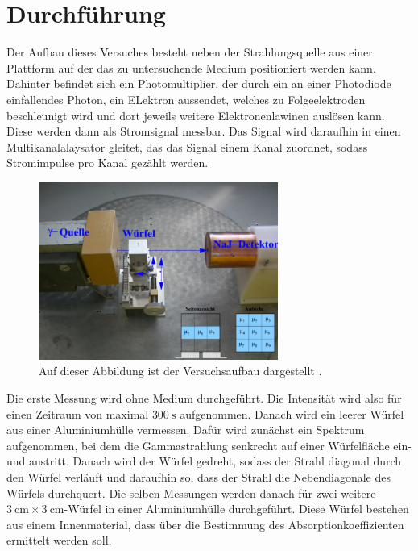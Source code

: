 \section{Durchführung}
\label{sec:Durchführung}

Der Aufbau dieses Versuches besteht neben der Strahlungsquelle aus einer Plattform auf der
das zu untersuchende Medium positioniert werden kann. Dahinter befindet sich ein 
Photomultiplier, der durch ein an einer Photodiode einfallendes Photon, ein ELektron 
aussendet, welches zu Folgeelektroden beschleunigt wird und dort jeweils weitere Elektronenlawinen 
auslösen kann. Diese werden dann als Stromsignal messbar. Das Signal wird daraufhin in 
einen Multikanalalaysator gleitet, das das Signal einem Kanal zuordnet, sodass Stromimpulse 
pro Kanal gezählt werden.

\begin{figure}
	\centering
	\includegraphics[width=0.7\textwidth]{figure/Aufbau.pdf}
	\caption{Auf dieser Abbildung ist der Versuchsaufbau dargestellt \cite{sample}.}
	\label{abb3}
\end{figure}

Die erste Messung wird ohne Medium durchgeführt. Die Intensität wird also für einen Zeitraum von 
maximal $\SI{300}{\second}$
aufgenommen. Danach wird ein leerer Würfel aus einer Aluminiumhülle vermessen. Dafür wird 
zunächst ein Spektrum aufgenommen, bei dem die Gammastrahlung senkrecht auf einer 
Würfelfläche ein- und austritt. Danach wird der Würfel gedreht, sodass der Strahl diagonal 
durch den Würfel verläuft und daraufhin so, dass der Strahl die Nebendiagonale des 
Würfels durchquert. Die selben Messungen werden danach für zwei weitere $\SI{3}{\centi\meter} \times \SI{3}{\centi\meter}$-Würfel 
in einer Aluminiumhülle durchgeführt. Diese Würfel bestehen aus einem Innenmaterial, dass 
über die Bestimmung des Absorptionkoeffizienten ermittelt werden soll. \\\\

